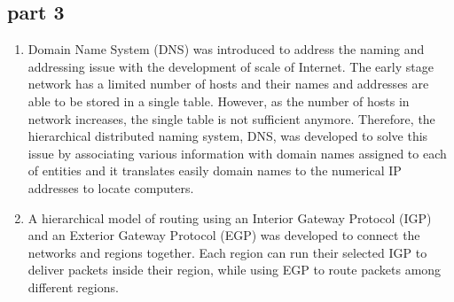 \subsection{part 3}

\begin{enumerate}
\item Domain Name System (DNS) was introduced to address the naming and addressing issue with the development of scale of Internet. The early stage network has a limited number of hosts and their names and addresses are able to be stored in a single table. However, as the number of hosts in network increases, the single table is not sufficient anymore. Therefore, the hierarchical distributed naming system, DNS, was developed to solve this issue by associating various information with domain names assigned to each of entities and it translates easily domain names to the numerical IP addresses to locate computers.
\item A hierarchical model of routing using an Interior Gateway Protocol (IGP) and an Exterior Gateway Protocol (EGP) was developed to connect the networks and regions together. Each region can run their selected IGP to deliver packets inside their region, while using EGP to route packets among different regions.
\end{enumerate}










